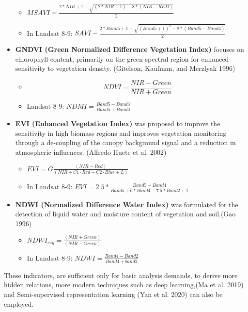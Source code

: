 \documentclass[
  letterpaper,
  DIV=11,
  numbers=noendperiod]{scrreprt}
\begin{document}
\begin{itemize}
  \begin{itemize}
  \item
    \(MSAVI = \frac{2*NIR + 1 - \sqrt{(2*NIR+1)-8*(NIR-RED)}}{2}\)
  \item
    In Landsat 8-9:
    \(SAVI - \frac{2*Band5 + 1 - \sqrt{(Band5+1)^2 -8*(Band5-Band4)}}{2}\)
  \end{itemize}
\item
  \textbf{GNDVI (Green Normalized Difference Vegetation Index)} focuses
  on chlorophyll content, primarily on the green spectral region for
  enhanced sensitivity to vegetation density. (Gitelson, Kaufman, and
  Merzlyak 1996)

  \begin{itemize}
  \item
    \[NDVI = \frac{NIR - Green}{NIR +Green}\]
  \item
    Landsat 8-9: \(NDMI =\frac{Band5 - Band3}{Band5 + Band3}\)
  \end{itemize}
\item
  \textbf{EVI (Enhanced Vegetation Index)} was proposed to improve the
  sensitivity in high biomass regions and improves vegetation monitoring
  through a de-coupling of the canopy background signal and a reduction
  in atmospheric influences. (Alfredo Huete et al. 2002)

  \begin{itemize}
  \item
    \(EVI=G \frac{(NIR−Red)}{(NIR+C1⋅Red−C2⋅Blue+L)}\)
  \item
    In Landsat 8-9:
    \(EVI = 2.5 * \frac{Band5 - Band4}{Band5 + 6* Band4 - 7.5*Band2 + 1}\)
  \end{itemize}
\item
  \textbf{NDWI (Normalized Difference Water Index)} was formulated for
  the detection of liquid water and moisture content of vegetation and
  soil.(Gao 1996)

  \begin{itemize}
  \item
    \(NDWI_{veg​}= \frac{(NIR+Green)}{(NIR−Green)}\)
  \item
    In Landsat 8-9: \(NDWI = \frac{Band4-Band2}{Band4+band2}\)
  \end{itemize}
\end{itemize}

These indicators, are sufficient only for basic analysis demands, to
derive more hidden relations, more modern techniques such as deep
learning,(Ma et al. 2019) and Semi-supervised representation learning
(Yan et al. 2020) can also be employed.
\end{document}
